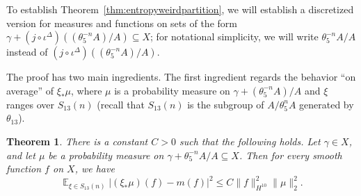 \documentclass[11pt]{amsart}
\newtheorem{theorem}[lemma]{Theorem}
\theoremstyle{definition}
\DeclareMathOperator*{\E}{\mathbb{E}}
\begin{document}
To establish Theorem~\ref{thm:entropyweirdpartition}, we will establish a discretized version for measures and functions on sets of the form $\gamma+(j \circ \iota^{\Delta})((\theta_5^{-n}A)/A) \subseteq X$; for notational simplicity, we will write $\theta_5^{-n}A/A$ instead of $(j \circ \iota^{\Delta})((\theta_5^{-n}A)/A)$.

The proof has two main ingredients.  The first ingredient regards the behavior ``on average'' of $\xi_* \mu$, where $\mu$ is a probability measure on $\gamma+(\theta_5^{-n}A)/A$ and $\xi$ ranges over $S_{13}(n)$ (recall that $S_{13}(n)$ is the subgroup of $A/\theta_5^n A$ generated by $\theta_{13}$).


\begin{theorem}\label{thm:rigidity}
There is a constant $C>0$ such that the following holds.  Let $\gamma \in X$, and let $\mu$ be a probability measure on $\gamma+\theta_5^{-n}A/A \subseteq X$.  Then for every smooth function $f$ on $X$, we have
$$\E_{\xi \in S_{13}(n)} |(\xi_* \mu)(f) - m(f)|^2 \leq C \|f\|_{H^{10}}^2\|\mu\|_2^2.$$
%
\end{theorem}
\end{document}
